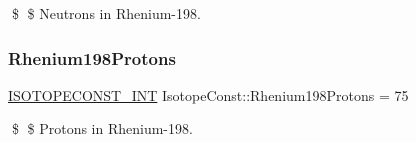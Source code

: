 \$ \$ Neutrons in Rhenium-\/198. \mbox{\label{group___isotope_const-_rhenium-_re198_ga04ecc6322e5998b3bd7c34d06aae3fe3}} 
\subsubsection{\texorpdfstring{Rhenium198\+Protons}{Rhenium198Protons}}
{\footnotesize\ttfamily \mbox{\hyperlink{group___isotope_const-_macros_ga5f18360b3e99483a35c32d789e62621c}{I\+S\+O\+T\+O\+P\+E\+C\+O\+N\+S\+T\+\_\+\+I\+NT}} Isotope\+Const\+::\+Rhenium198\+Protons = 75}

\$ \$ Protons in Rhenium-\/198. 